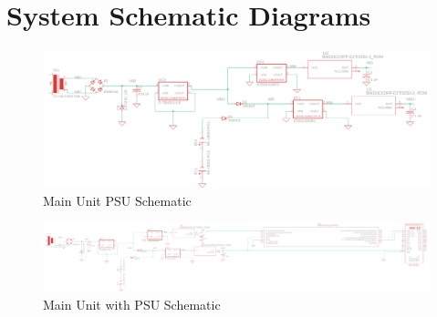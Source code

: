 \section{System Schematic Diagrams}
\begin{landscape}
  \begin{center}
  \begin{figure}[H]
    \centering \includegraphics[width=1.6\textwidth]{../Power-Supply/Main Unit PSU/main-unit-psu.png}
    \caption{Main Unit PSU Schematic}
    \label{fig:main-psu-schematic}
  \end{figure}
  \end{center}
\end{landscape}
\begin{landscape}
  \begin{center}
  \begin{figure}[H]
    \centering \includegraphics[width=1.5\textwidth]{../Main-Unit-and-PSU/Figures/main-unit-and-psu.png}
    \caption{Main Unit with PSU Schematic}
    \label{fig:main-with-psu-schematic}
  \end{figure}
  \end{center}
\end{landscape}
